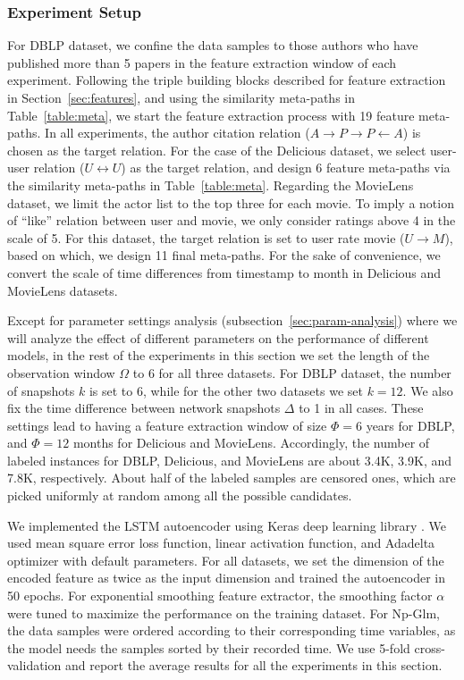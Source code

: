 \subsubsection{Experiment Setup}


For DBLP dataset, we confine the data samples to those authors who have published more than 5 papers in the feature extraction window of each experiment. Following the triple building blocks described for feature extraction in Section~\ref{sec:features}, and using the similarity meta-paths in Table~\ref{table:meta}, we start the feature extraction process with 19 feature meta-paths. In all experiments, the author citation relation ($A\rightarrow P\rightarrow P\leftarrow A$) is chosen as the target relation. 
For the case of the Delicious dataset, we select user-user relation ($U\leftrightarrow U$) as the target relation, and design 6 feature meta-paths via the similarity meta-paths in Table~\ref{table:meta}.
Regarding the MovieLens dataset, we limit the actor list to the top three for each movie. To imply a notion of ``like'' relation between user and movie, we only consider ratings above 4 in the scale of 5. For this dataset, the target relation is set to user rate movie ($U\rightarrow M$), based on which, we design 11 final meta-paths. For the sake of convenience, we convert the scale of time differences from timestamp to month in Delicious and MovieLens datasets.

Except for parameter settings analysis (subsection~\ref{sec:param-analysis}) where we will analyze the effect of different parameters on the performance of different models, in the rest of the experiments in this section we set the length of the observation window $\Omega$ to 6 for all three datasets. For DBLP dataset, the number of snapshots $k$ is set to 6, while for the other two datasets we set $k=12$. We also fix the time difference between network snapshots $\Delta$ to 1 in all cases. These settings lead to having a feature extraction window of size $\Phi=6$ years for DBLP, and $\Phi=12$ months for Delicious and MovieLens. Accordingly, the number of labeled instances for DBLP, Delicious, and MovieLens are about 3.4K, 3.9K, and 7.8K, respectively. About half of the labeled samples are censored ones, which are picked uniformly at random among all the possible candidates.

We implemented the LSTM autoencoder using Keras deep learning library \cite{chollet2015keras}. We used mean square error loss function, linear activation function, and Adadelta optimizer \cite{zeiler2012adadelta} with default parameters. For all datasets, we set the dimension of the encoded feature as twice as the input dimension and trained the autoencoder in 50 epochs. For exponential smoothing feature extractor, the smoothing factor $\alpha$ were tuned to maximize the performance on the training dataset. For Np-Glm, the data samples were ordered according to their corresponding time variables, as the model needs the samples sorted by their recorded time. We use 5-fold cross-validation and report the average results for all the experiments in this section.

